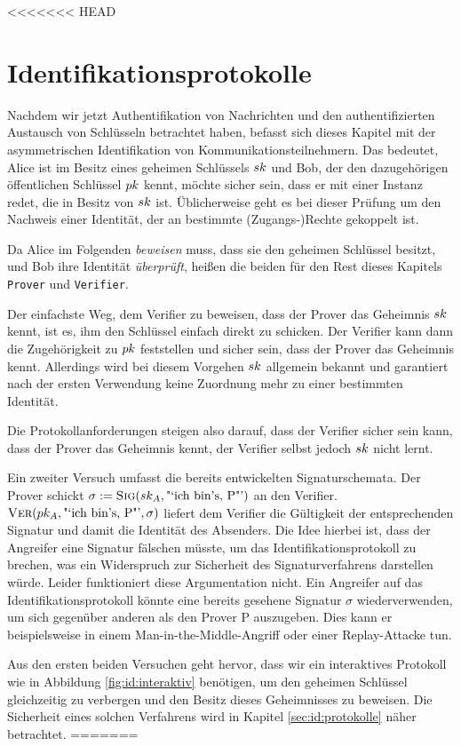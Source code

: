 <<<<<<< HEAD
\chapter{Identifikationsprotokolle} Nachdem wir jetzt Authentifikation
von Nachrichten und den authentifizierten Austausch von Schlüsseln
betrachtet haben, befasst sich dieses Kapitel mit der asymmetrischen
Identifikation von Kommunikationsteilnehmern. Das bedeutet, Alice ist im
Besitz eines geheimen Schlüssels $sk$ und Bob, der den dazugehörigen
öffentlichen Schlüssel $pk$ kennt, möchte sicher sein, dass er mit
einer Instanz redet, die in Besitz von $sk$ ist. Üblicherweise geht
es bei dieser Prüfung um den Nachweis einer Identität, der an bestimmte
(Zugangs-)Rechte gekoppelt ist.

Da Alice im Folgenden \emph{beweisen} muss, dass sie den geheimen
Schlüssel besitzt, und Bob ihre Identität \emph{überprüft}, heißen die
beiden für den Rest dieses Kapitels \texttt{Prover} und
\texttt{Verifier}.

Der einfachste Weg, dem Verifier zu beweisen, dass der Prover das
Geheimnis $sk$ kennt, ist es, ihm den Schlüssel einfach direkt zu
schicken. Der Verifier kann dann die Zugehörigkeit zu $pk$
feststellen und sicher sein, dass der Prover das Geheimnis
kennt. Allerdings wird bei diesem Vorgehen $sk$ allgemein bekannt und
garantiert nach der ersten Verwendung keine Zuordnung mehr zu einer
bestimmten Identität.

Die Protokollanforderungen steigen also darauf, dass der Verifier sicher
sein kann, dass der Prover das Geheimnis kennt, der Verifier selbst
jedoch $sk$ nicht lernt.

Ein zweiter Versuch umfasst die bereits entwickelten
Signaturschemata. Der Prover schickt $\sigma := \textsc{Sig}(sk_A,
\text{"`ich bin's, P"'})$ an den Verifier.  $\textsc{Ver}(pk_A,\text{"`ich
bin's, P"'}, \sigma)$ liefert dem Verifier die Gültigkeit der
entsprechenden Signatur und damit die Identität des Absenders. Die Idee
hierbei ist, dass der Angreifer eine Signatur fälschen müsste, um das
Identifikationsprotokoll zu brechen, was ein Widerspruch zur Sicherheit
des Signaturverfahrens darstellen würde. Leider funktioniert diese
Argumentation nicht. Ein Angreifer auf das Identifikationsprotokoll
könnte eine bereits gesehene Signatur $\sigma$ wiederverwenden, um sich
gegenüber anderen als den Prover P auszugeben. Dies kann er
beispielsweise in einem Man-in-the-Middle-Angriff oder einer
Replay-Attacke tun.

Aus den ersten beiden Versuchen geht hervor, dass wir ein interaktives
Protokoll wie in Abbildung \ref{fig:id:interaktiv} benötigen, um den
geheimen Schlüssel gleichzeitig zu verbergen und den Besitz dieses
Geheimnisses zu beweisen. Die Sicherheit eines solchen Verfahrens wird
in Kapitel \ref{sec:id:protokolle} näher betrachtet.
=======
